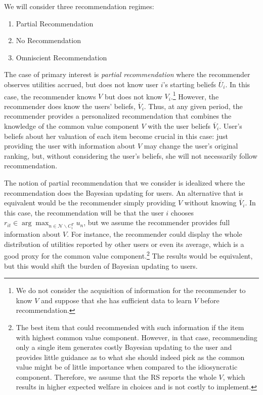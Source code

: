 \documentclass[sigconf]{acmart}
\begin{document}
We will consider three recommendation regimes:
\begin{enumerate}
\item Partial Recommendation
\item No Recommendation
\item Omniscient Recommendation
\end{enumerate}
The case of primary interest is \textit{partial recommendation} where the recommender observes utilities accrued, but does not know user $i$'s starting beliefs $\overline U_i$. In this case, the recommender knows $V$ but does not know $V_i$.\footnote{We do not consider the acquisition of information for the recommender to know $V$ and suppose that she has sufficient data to learn $V$ before recommendation.} However, the recommender does know the users' beliefs, $\overline V_i$. Thus, at any given period, the recommender provides a personalized recommendation that combines the knowledge of the common value component $V$ with the user beliefs $\overline V_i$. User's beliefs about her valuation of each item become crucial in this case: just providing the user with information about $V$ may change the user's original ranking, but, without considering the user's beliefs, she will not necessarily follow recommendation.

The notion of partial recommendation that we consider is idealized where the recommendation does the Bayesian updating for users. An alternative that is equivalent would be the recommender simply providing $V$ without knowing $\overline V_i$. In this case, the recommendation will be that the user $i$ chooses $r_{it} \in \arg \max_{n \in \mathcal{N} \backslash C_i^T} u_n$, but we assume the recommender provides full information about $V$. For instance, the recommender could display the whole distribution of utilities reported by other users or even its average, which is a good proxy for the common value component.\footnote{
The best item that could recommended with such information if the item with highest common value component. However, in that case, recommending only a single item generates costly Bayesian updating to the user and provides little guidance as to what she should indeed pick as the common value might be of little importance when compared to the idiosyncratic component. Therefore, we assume that the RS reports the whole $V$, which results in higher expected welfare in choices and is not costly to implement.
} The results would be equivalent, but this would shift the burden of Bayesian updating to users.
\end{document}
